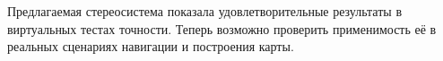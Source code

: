 
Предлагаемая стереосистема показала удовлетворительные результаты в виртуальных тестах 
точности. Теперь возможно проверить применимость её в реальных сценариях навигации и построения 
карты. 